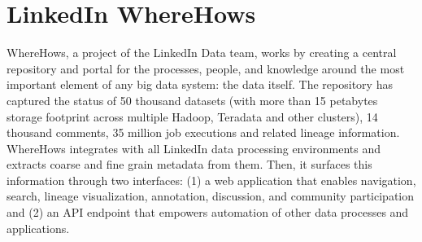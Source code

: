 \section{LinkedIn WhereHows}

WhereHows, a project of the LinkedIn Data team, works by creating a central
repository and portal for the processes, people, and knowledge around the most
important element of any big data system: the data itself. The repository has
captured the status of 50 thousand datasets (with more than 15 petabytes storage
footprint across multiple Hadoop, Teradata and other clusters), 14 thousand
comments, 35 million job executions and related lineage
information.\cite{ wherehows-web} WhereHows integrates with all LinkedIn data
processing environments and extracts coarse and fine grain metadata from them.
Then, it surfaces this information through two interfaces: (1) a web application
that enables navigation, search, lineage visualization, annotation, discussion,
and community participation and (2) an API endpoint that empowers automation of
other data processes and applications.\cite{wherehows-wiki}
 
 

